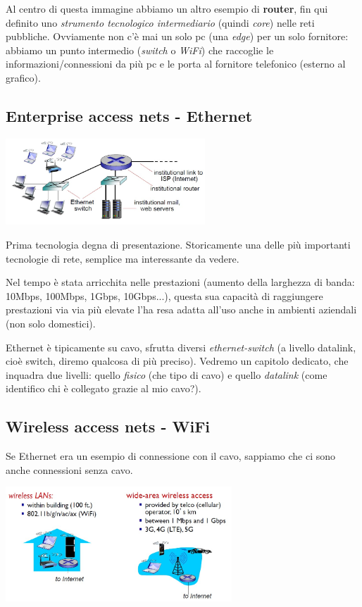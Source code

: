 \documentclass[10pt, a4paper, openany]{book}
\begin{document}
\noindent Al centro di questa immagine abbiamo un altro esempio di \textbf{router}, fin qui definito uno \textit{strumento tecnologico intermediario} (quindi \textit{core}) nelle reti pubbliche. Ovviamente non c'è mai un solo pc (una \textit{edge}) per un solo fornitore: abbiamo un punto intermedio (\textit{switch} o \textit{WiFi}) che raccoglie le informazioni/connessioni da più pc e le porta al fornitore telefonico (esterno al grafico).

\subsection{Enterprise access nets - Ethernet}
\includegraphics[width=75mm]{cap1 - Introduzione alle reti - 4.jpg}

\noindent Prima tecnologia degna di presentazione. Storicamente una delle più importanti tecnologie di rete, semplice ma interessante da vedere.

\noindent Nel tempo è stata arricchita nelle prestazioni (aumento della larghezza di banda: 10Mbps, 100Mbps, 1Gbps, 10Gbps...), questa sua capacità di raggiungere prestazioni via via più elevate l'ha resa adatta all'uso anche in ambienti aziendali (non solo domestici).

\noindent Ethernet è tipicamente su cavo, sfrutta diversi \textit{ethernet-switch} (a livello datalink, cioè switch, diremo qualcosa di più preciso). Vedremo un capitolo dedicato, che inquadra due livelli: quello \textit{fisico} (che tipo di cavo) e quello \textit{datalink} (come identifico chi è collegato grazie al mio cavo?).

\subsection{Wireless access nets - WiFi}

\noindent Se Ethernet era un esempio di connessione con il cavo, sappiamo che ci sono anche connessioni senza cavo.

\includegraphics[width=85mm]{cap1 - Introduzione alle reti - 5.jpg}
\end{document}
